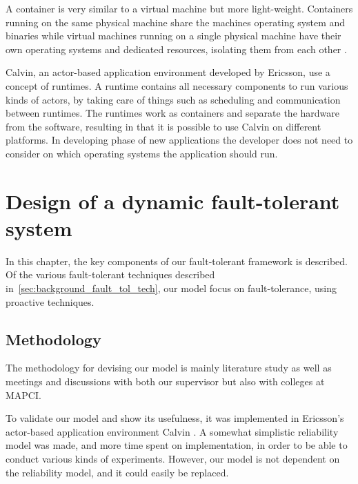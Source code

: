 \documentclass{cslthse-msc}
\begin{document}
A container is very similar to a virtual machine but more light-weight. Containers running on the same physical machine share the machines operating system and binaries while virtual machines running on a single physical machine have their own operating systems and dedicated resources, isolating them from each other \cite{vm_vs_container}.

Calvin, an actor-based application environment developed by Ericsson, use a concept of runtimes. A runtime contains all necessary components to run various kinds of actors, by taking care of things such as scheduling and communication between runtimes. The runtimes work as containers and separate the hardware from the software, resulting in that it is possible to use Calvin on different platforms. In developing phase of new applications the developer does not need to consider on which operating systems the application should run.

\chapter{Design of a dynamic fault-tolerant system} \label{ch:design}
In this chapter, the key components of our fault-tolerant framework is described. Of the various fault-tolerant techniques described in~\ref{sec:background_fault_tol_tech}, our model focus on fault-tolerance, using proactive techniques.

\section{Methodology} \label{sec:design_methodology}
The methodology for devising our model is mainly literature study as well as meetings and discussions with both our supervisor but also with colleges at MAPCI.

To validate our model and show its usefulness, it was implemented in Ericsson's actor-based application environment Calvin \cite{calvin}. A somewhat simplistic reliability model was made, and more time spent on implementation, in order to be able to conduct various kinds of experiments. However, our model is not dependent on the reliability model, and it could easily be replaced.
\end{document}
